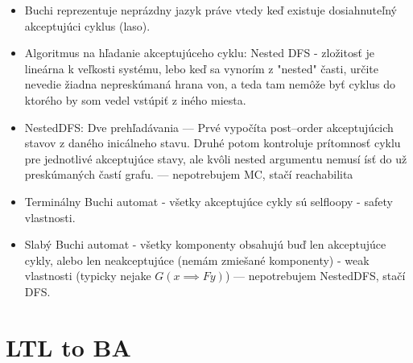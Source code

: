 \documentclass[paper=a4, fontsize=11pt]{scrartcl} %
\numberwithin{equation}{section} %
\numberwithin{figure}{section} %
\numberwithin{table}{section} %
\begin{document}
\begin{itemize}
		\item Buchi reprezentuje neprázdny jazyk práve vtedy keď existuje dosiahnuteľný akceptujúci cyklus (laso).
		
		\item Algoritmus na hľadanie akceptujúceho cyklu: Nested DFS - zložitosť je lineárna k veľkosti systému, lebo keď sa vynorím z "nested" časti, určite nevedie žiadna nepreskúmaná hrana von, a teda tam nemôže byť cyklus do ktorého by som vedel vstúpiť z iného miesta.
		
		\item NestedDFS: Dve prehľadávania — Prvé vypočíta post–order akceptujúcich stavov z daného inicálneho stavu. Druhé potom kontroluje prítomnosť cyklu pre jednotlivé akceptujúce stavy, ale kvôli nested argumentu nemusí ísť do už preskúmaných častí grafu. — nepotrebujem MC, stačí reachabilita
		
		\item Terminálny Buchi automat - všetky akceptujúce cykly sú selfloopy - safety vlastnosti.
		\item Slabý Buchi automat - všetky komponenty obsahujú buď len akceptujúce cykly, alebo len neakceptujúce (nemám zmiešané komponenty) - weak vlastnosti (typicky nejake $G(x \implies F y)$) — nepotrebujem NestedDFS, stačí DFS.
		
	\end{itemize}

	\section{LTL to BA}
	
\end{document}
